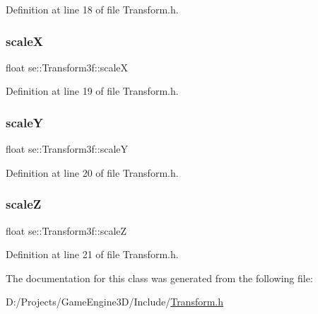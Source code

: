Definition at line 18 of file Transform.\+h.

\mbox{\label{classse_1_1_transform3f_af87cb468268b871f516059ab9f84035f}} 
\subsubsection{\texorpdfstring{scaleX}{scaleX}}
{\footnotesize\ttfamily float se\+::\+Transform3f\+::scaleX}



Definition at line 19 of file Transform.\+h.

\mbox{\label{classse_1_1_transform3f_abc893c842f0fcbfe910b48b38e56a241}} 
\subsubsection{\texorpdfstring{scaleY}{scaleY}}
{\footnotesize\ttfamily float se\+::\+Transform3f\+::scaleY}



Definition at line 20 of file Transform.\+h.

\mbox{\label{classse_1_1_transform3f_af25deb0eb4f11f5f3e1f369a86bb3a91}} 
\subsubsection{\texorpdfstring{scaleZ}{scaleZ}}
{\footnotesize\ttfamily float se\+::\+Transform3f\+::scaleZ}



Definition at line 21 of file Transform.\+h.



The documentation for this class was generated from the following file\+:\begin{DoxyCompactItemize}
\item 
D\+:/\+Projects/\+Game\+Engine3\+D/\+Include/\mbox{\hyperlink{_transform_8h}{Transform.\+h}}\end{DoxyCompactItemize}
